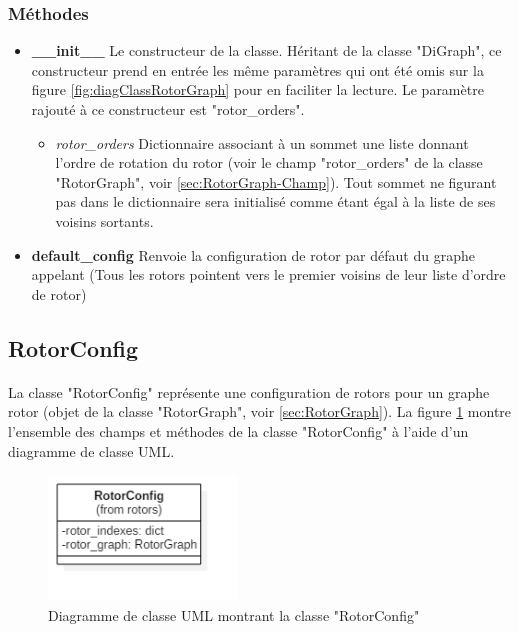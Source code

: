 \documentclass{article}
\begin{document}
			\subsubsection{Méthodes}
				\begin{itemize}
					\item \textbf{\_\_init\_\_}\newline
					Le constructeur de la classe. Héritant de la classe "DiGraph", ce constructeur prend en entrée les même paramètres qui ont été omis sur la figure \ref{fig:diagClassRotorGraph} pour en faciliter la lecture. Le paramètre rajouté à ce constructeur est "rotor\_orders".
					\begin{itemize}
						\item \textit{rotor\_orders}\newline
						Dictionnaire associant à un sommet une liste donnant l'ordre de rotation du rotor (voir le champ "rotor\_orders" de la classe "RotorGraph", voir \ref{sec:RotorGraph-Champ}). Tout sommet ne figurant pas dans le dictionnaire sera initialisé comme étant égal à la liste de ses voisins sortants. 
					\end{itemize}
					\item \textbf{default\_config}\newline
					Renvoie la configuration de rotor par défaut du graphe appelant (Tous les rotors pointent vers le premier voisins de leur liste d'ordre de rotor)
				\end{itemize}
	
		\subsection{RotorConfig}
			\paragraph*{}
			La classe "RotorConfig" représente une configuration de rotors pour un graphe rotor (objet de la classe "RotorGraph", voir \ref{sec:RotorGraph}). La figure \ref{fig:diagClassRotorConfig} montre l'ensemble des champs et méthodes de la classe "RotorConfig" à l'aide d'un diagramme de classe UML.
			
			\begin{figure}[h]
				\includegraphics[width=5cm]{diagClassRotorConfig.png}
				\centering
				\caption{Diagramme de classe UML montrant la classe "RotorConfig"}
				\label{fig:diagClassRotorConfig}
			\end{figure}
			
\end{document}
